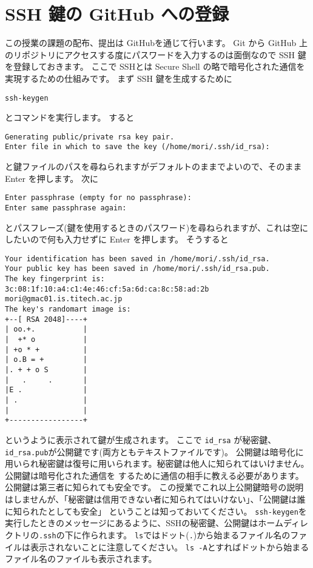 \documentclass[a4paper]{article}
\begin{document}
\section{SSH 鍵の GitHub への登録}
この授業の課題の配布、提出は GitHubを通じて行います。
Git から GitHub 上のリポジトリにアクセスする度にパスワードを入力するのは面倒なので SSH 鍵を登録しておきます。
ここで SSHとは Secure Shell の略で暗号化された通信を実現するための仕組みです。
まず SSH 鍵を生成するために
\begin{verbatim}
ssh-keygen
\end{verbatim}
とコマンドを実行します。
すると
\begin{verbatim}
Generating public/private rsa key pair.
Enter file in which to save the key (/home/mori/.ssh/id_rsa): 
\end{verbatim}
と鍵ファイルのパスを尋ねられますがデフォルトのままでよいので、そのまま Enter を押します。
次に
\begin{verbatim}
Enter passphrase (empty for no passphrase): 
Enter same passphrase again: 
\end{verbatim}
とパスフレーズ(鍵を使用するときのパスワード)を尋ねられますが、これは空にしたいので何も入力せずに Enter を押します。
そうすると
\begin{verbatim}
Your identification has been saved in /home/mori/.ssh/id_rsa.
Your public key has been saved in /home/mori/.ssh/id_rsa.pub.
The key fingerprint is:
3c:08:1f:10:a4:c1:4e:46:cf:5a:6d:ca:8c:58:ad:2b mori@gmac01.is.titech.ac.jp
The key's randomart image is:
+--[ RSA 2048]----+
| oo.+.           |
|  +* o           |
| +o * +          |
| o.B = +         |
|. + + o S        |
|   .     .       |
|E .              |
| .               |
|                 |
+-----------------+
\end{verbatim}
というように表示されて鍵が生成されます。
ここで \texttt{id\_rsa} が秘密鍵、\texttt{id\_rsa.pub}が公開鍵です(両方ともテキストファイルです)。
公開鍵は暗号化に用いられ秘密鍵は復号に用いられます。秘密鍵は他人に知られてはいけません。公開鍵は暗号化された通信を
するために通信の相手に教える必要があります。公開鍵は第三者に知られても安全です。
この授業でこれ以上公開鍵暗号の説明はしませんが、「秘密鍵は信用できない者に知られてはいけない」、「公開鍵は誰に知られたとしても安全」
ということは知っておいてください。
\texttt{ssh-keygen}を実行したときのメッセージにあるように、SSHの秘密鍵、公開鍵はホームディレクトリの\texttt{.ssh}の下に作られます。
\texttt{ls}ではドット(\texttt{.})から始まるファイル名のファイルは表示されないことに注意してください。
\texttt{ls -A}とすればドットから始まるファイル名のファイルも表示されます。
\end{document}
